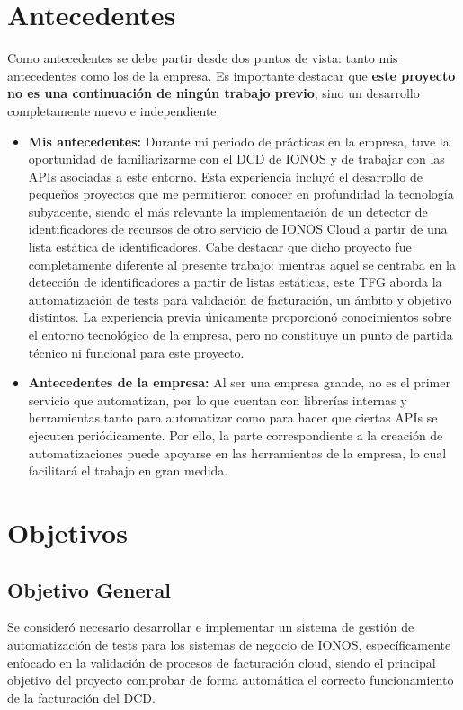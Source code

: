 \section{Antecedentes}\label{sec:antecedentes}
Como antecedentes se debe partir desde dos puntos de vista: tanto mis antecedentes como los de la empresa. Es importante destacar que \textbf{este proyecto no es una continuación de ningún trabajo previo}, sino un desarrollo completamente nuevo e independiente.
\begin{itemize}
    \item \textbf{Mis antecedentes: }Durante mi periodo de prácticas en la empresa, tuve la oportunidad de familiarizarme con el DCD de IONOS y de trabajar con las APIs asociadas a este entorno. Esta experiencia incluyó el desarrollo de pequeños proyectos que me permitieron conocer en profundidad la tecnología subyacente, siendo el más relevante la implementación de un detector de identificadores de recursos de otro servicio de IONOS Cloud a partir de una lista estática de identificadores. Cabe destacar que dicho proyecto fue completamente diferente al presente trabajo: mientras aquel se centraba en la detección de identificadores a partir de listas estáticas, este TFG aborda la automatización de tests para validación de facturación, un ámbito y objetivo distintos. La experiencia previa únicamente proporcionó conocimientos sobre el entorno tecnológico de la empresa, pero no constituye un punto de partida técnico ni funcional para este proyecto.
    \item  \textbf{Antecedentes de la empresa: } Al ser una empresa grande, no es el primer servicio que automatizan, por lo que cuentan con librerías internas y herramientas tanto para automatizar como para hacer que ciertas APIs se ejecuten periódicamente. Por ello, la parte correspondiente a la creación de automatizaciones puede apoyarse en las herramientas de la empresa, lo cual facilitará el trabajo en gran medida.

\end{itemize}
\section{Objetivos}\label{sec:objetivos}

\subsection{Objetivo General}
Se consideró necesario desarrollar e implementar un sistema de gestión de automatización de tests para los sistemas de negocio de IONOS, específicamente enfocado en la validación de procesos de facturación cloud, siendo el principal objetivo del proyecto comprobar de forma automática el correcto funcionamiento de la facturación del DCD.

